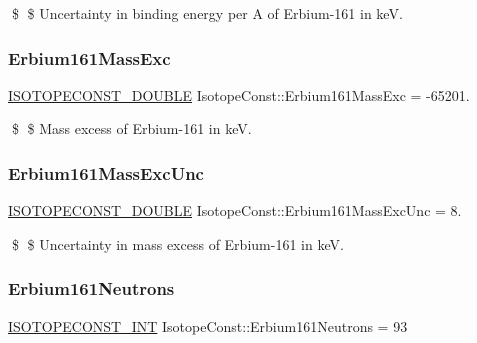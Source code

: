 \$ \$ Uncertainty in binding energy per A of Erbium-\/161 in keV. \mbox{\label{group___isotope_const-_erbium-_er161_gabd956b264c91f091bef02d42ef27622b}} 
\subsubsection{\texorpdfstring{Erbium161\+Mass\+Exc}{Erbium161MassExc}}
{\footnotesize\ttfamily \mbox{\hyperlink{group___isotope_const-_macros_ga8f45a7272ce02c0b4c65c44636ed719a}{I\+S\+O\+T\+O\+P\+E\+C\+O\+N\+S\+T\+\_\+\+D\+O\+U\+B\+LE}} Isotope\+Const\+::\+Erbium161\+Mass\+Exc = -\/65201.}

\$ \$ Mass excess of Erbium-\/161 in keV. \mbox{\label{group___isotope_const-_erbium-_er161_ga7a9424e491e2579a77b0e82641e6c16c}} 
\subsubsection{\texorpdfstring{Erbium161\+Mass\+Exc\+Unc}{Erbium161MassExcUnc}}
{\footnotesize\ttfamily \mbox{\hyperlink{group___isotope_const-_macros_ga8f45a7272ce02c0b4c65c44636ed719a}{I\+S\+O\+T\+O\+P\+E\+C\+O\+N\+S\+T\+\_\+\+D\+O\+U\+B\+LE}} Isotope\+Const\+::\+Erbium161\+Mass\+Exc\+Unc = 8.}

\$ \$ Uncertainty in mass excess of Erbium-\/161 in keV. \mbox{\label{group___isotope_const-_erbium-_er161_ga60e0674458983f070af301c29928fb32}} 
\subsubsection{\texorpdfstring{Erbium161\+Neutrons}{Erbium161Neutrons}}
{\footnotesize\ttfamily \mbox{\hyperlink{group___isotope_const-_macros_ga5f18360b3e99483a35c32d789e62621c}{I\+S\+O\+T\+O\+P\+E\+C\+O\+N\+S\+T\+\_\+\+I\+NT}} Isotope\+Const\+::\+Erbium161\+Neutrons = 93}

